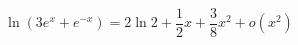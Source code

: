 \begin{displaymath}
  \ln\left( 3e^x+e^{-x}\right)  = 2\ln 2 + \frac{1}{2}x  + \frac{3}{8}x^2 + o(x^2)
\end{displaymath}


